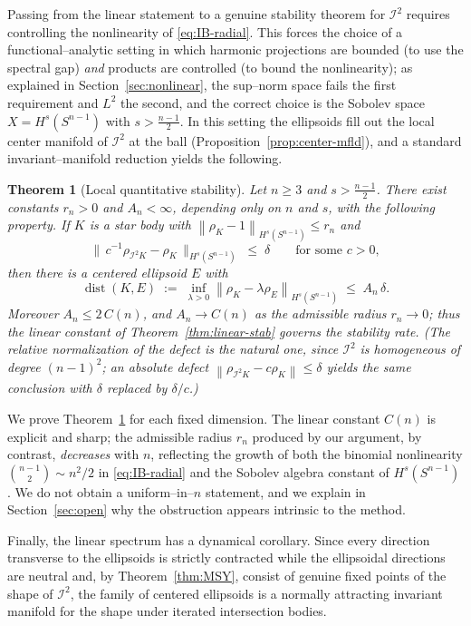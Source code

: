 \documentclass[11pt,reqno]{amsart}
\theoremstyle{plain}
\newtheorem{theorem}{Theorem}[section]
\theoremstyle{definition}
\newcommand{\Sph}{S^{n-1}}
\newcommand{\IB}{\mathcal{I}}
\newcommand{\norm}[1]{\left\lVert #1 \right\rVert}
\DeclareMathOperator{\dist}{dist}
\begin{document}
Passing from the linear statement to a genuine stability theorem for $\IB^2$
requires controlling the nonlinearity of \eqref{eq:IB-radial}. This forces the
choice of a functional--analytic setting in which harmonic projections are
bounded (to use the spectral gap) \emph{and} products are controlled (to bound
the nonlinearity); as explained in Section~\ref{sec:nonlinear}, the sup--norm
space fails the first requirement and $L^2$ the second, and the correct choice
is the Sobolev space $X=H^s(\Sph)$ with $s>\tfrac{n-1}{2}$. In this setting the
ellipsoids fill out the local center manifold of $\IB^2$ at the ball
(Proposition~\ref{prop:center-mfld}), and a standard invariant--manifold
reduction yields the following.

\begin{theorem}[Local quantitative stability]\label{thm:nonlinear}
Let $n\ge 3$ and $s>\tfrac{n-1}{2}$. There exist constants $r_n>0$ and
$A_n<\infty$, depending only on $n$ and $s$, with the following property. If $K$
is a star body with $\norm{\rho_K-1}_{H^s(\Sph)}\le r_n$ and
\[
   \Big\|\,c^{-1}\rho_{\IB^2 K}-\rho_K\,\Big\|_{H^s(\Sph)}\;\le\;\delta
   \qquad\text{for some } c>0,
\]
then there is a centered ellipsoid $E$ with
\[
   \dist(K,E)\;:=\;\inf_{\lambda>0}\norm{\rho_K-\lambda\rho_E}_{H^s(\Sph)}
   \;\le\; A_n\,\delta .
\]
Moreover $A_n\le 2\,C(n)$, and $A_n\to C(n)$ as the admissible radius
$r_n\to0$; thus the linear constant of Theorem~\ref{thm:linear-stab} governs
the stability rate. (The relative normalization of the defect is the natural
one, since $\IB^2$ is homogeneous of degree $(n-1)^2$; an absolute defect
$\norm{\rho_{\IB^2K}-c\rho_K}\le\delta$ yields the same conclusion with
$\delta$ replaced by $\delta/c$.)
\end{theorem}

We prove Theorem~\ref{thm:nonlinear} for each fixed dimension. The linear
constant $C(n)$ is explicit and sharp; the admissible radius $r_n$ produced by
our argument, by contrast, \emph{decreases} with $n$, reflecting the growth of
both the binomial nonlinearity $\binom{n-1}{2}\sim n^2/2$ in
\eqref{eq:IB-radial} and the Sobolev algebra constant of $H^s(\Sph)$. We do not
obtain a uniform--in--$n$ statement, and we explain in Section~\ref{sec:open}
why the obstruction appears intrinsic to the method.

Finally, the linear spectrum has a dynamical corollary. Since every direction
transverse to the ellipsoids is strictly contracted while the ellipsoidal
directions are neutral and, by Theorem~\ref{thm:MSY}, consist of genuine
fixed points of the shape of $\IB^2$, the family of centered ellipsoids is a
normally attracting invariant manifold for the shape under iterated
intersection bodies.
\end{document}
